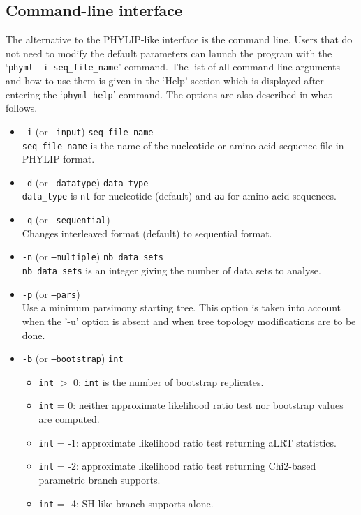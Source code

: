 \documentclass[a4paper,12pt]{article}
\newcommand{\x}[1]{\texttt{#1}}
\begin{document}
\subsection{Command-line interface}

The alternative to the  PHYLIP-like interface is the command line. Users that  do not need to modify
the default parameters can launch the  program with the `\x{phyml -i seq\_file\_name}' command.  The
list of  all command line  arguments and how  to use them  is given in  the `Help' section  which is
displayed  after entering the  `\x{phyml help}'  command.  The  options are  also described  in what
follows.

\begin{itemize}
\item \x{-i} (or \x{--input}) \x{seq\_file\_name} \\
\x{seq\_file\_name} is the name of the nucleotide or amino-acid sequence file in PHYLIP format.


\item \x{-d} (or \x{--datatype}) \x{data\_type}\\
\x{data\_type} is \x{nt} for nucleotide (default) and \x{aa} for amino-acid sequences.


\item \x{-q} (or \x{--sequential}) \\
Changes interleaved format (default) to sequential format.


\item \x{-n} (or \x{--multiple}) \x{nb\_data\_sets}\\
\x{nb\_data\_sets} is an integer giving the number of data sets to analyse.

\item \x{-p} (or \x{--pars})\\
Use a minimum parsimony starting tree. This option is taken into account when the '-u' option
is absent and when tree topology modifications are to be done.


\item \x{-b} (or \x{--bootstrap}) \x{int} \\
\begin{itemize}  
\item \x{int} $>$  0: \x{int} is the number of bootstrap replicates.
\item \x{int} =  0: neither approximate likelihood ratio test nor bootstrap values are computed.
\item \x{int} = -1: approximate likelihood ratio test returning aLRT statistics.
\item \x{int} = -2: approximate likelihood ratio test returning Chi2-based parametric branch supports.
\item \x{int} = -4: SH-like branch supports alone.
\end{itemize}


\end{itemize}
\end{document}
